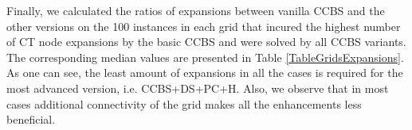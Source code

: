 \documentclass[letterpaper]{article} %
\newcommand{\ccbs}{\ac{CCBS}\xspace}
\newcommand{\ct}{\ac{CT}\xspace}
\begin{document}
Finally, we calculated the ratios of expansions between vanilla CCBS and the other versions
on the 100 instances in each grid that incured the highest number of \ct node expansions by the basic \ccbs and were solved by all \ccbs variants.
The corresponding median values are presented in Table \ref{TableGridsExpansions}. As one can see, the least amount of expansions in all the cases is required for the most advanced version, i.e. CCBS+DS+PC+H. Also, we observe that in most cases additional connectivity of the grid makes all the enhancements less beneficial. %


\end{document}

